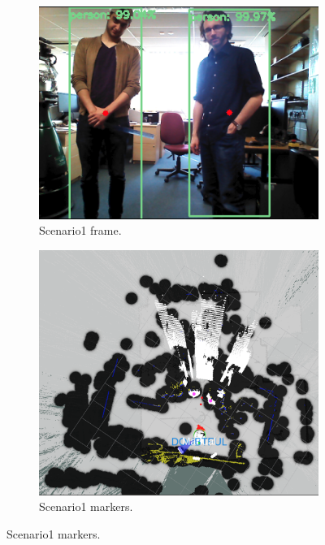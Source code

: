 \begin{figure}[H]
    \begin{subfigure}{.5\textwidth}
        \centering
        \includegraphics[width=\linewidth]{images/chapter6_scenario1.png}
        \caption{Scenario1 frame.}
        \label{2a}
	\end{subfigure}
    \begin{subfigure}{.5\textwidth}
        \centering
        \includegraphics[width=\linewidth]{images/chapter6_rviz_extend.png}
        \caption{Scenario1 markers.}
        \label{2b}
	\end{subfigure}
\end{figure}

